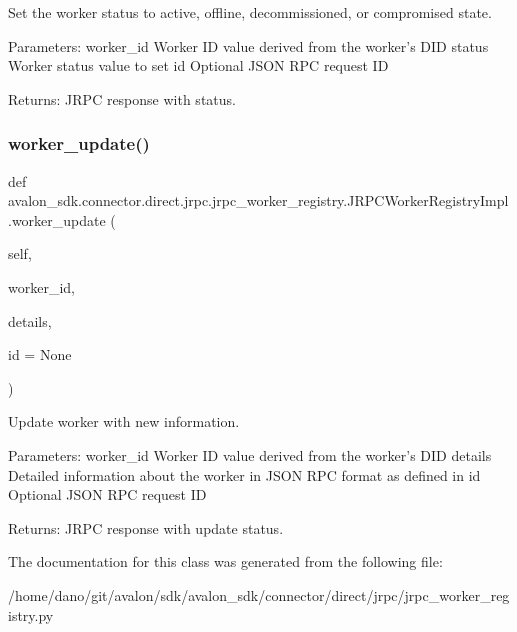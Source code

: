 \begin{DoxyVerb}Set the worker status to active, offline,
decommissioned, or compromised state.

Parameters:
worker_id  Worker ID value derived from the worker's DID
status     Worker status value to set
id         Optional JSON RPC request ID

Returns:
JRPC response with status.
\end{DoxyVerb}
 \mbox{\label{classavalon__sdk_1_1connector_1_1direct_1_1jrpc_1_1jrpc__worker__registry_1_1JRPCWorkerRegistryImpl_a55928c62f7c9cbd0aac937a39ac434a4}} 
\subsubsection{\texorpdfstring{worker\+\_\+update()}{worker\_update()}}
{\footnotesize\ttfamily def avalon\+\_\+sdk.\+connector.\+direct.\+jrpc.\+jrpc\+\_\+worker\+\_\+registry.\+J\+R\+P\+C\+Worker\+Registry\+Impl.\+worker\+\_\+update (\begin{DoxyParamCaption}\item[{}]{self,  }\item[{}]{worker\+\_\+id,  }\item[{}]{details,  }\item[{}]{id = {\ttfamily None} }\end{DoxyParamCaption})}

\begin{DoxyVerb}Update worker with new information.

Parameters:
worker_id Worker ID value derived from the worker's DID
details   Detailed information about the worker in
  JSON RPC format as defined in
id        Optional JSON RPC request ID

Returns:
JRPC response with update status.
\end{DoxyVerb}
 

The documentation for this class was generated from the following file\+:\begin{DoxyCompactItemize}
\item 
/home/dano/git/avalon/sdk/avalon\+\_\+sdk/connector/direct/jrpc/jrpc\+\_\+worker\+\_\+registry.\+py\end{DoxyCompactItemize}
